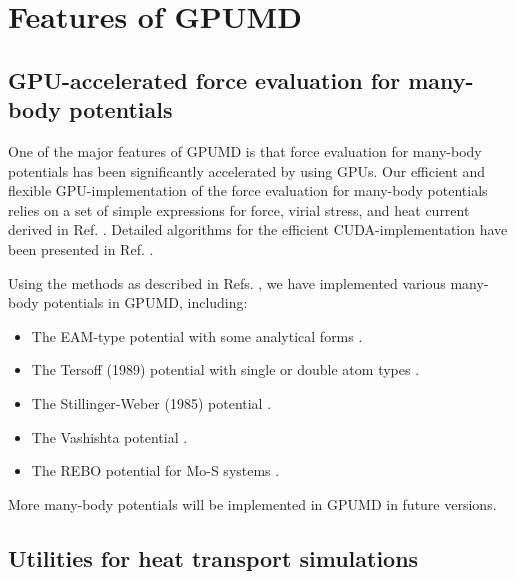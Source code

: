 \documentclass[12pt,a4paper]{report}
\begin{document}
\chapter{Features of GPUMD}


\section{GPU-accelerated force evaluation for many-body potentials}

One of the major features of GPUMD is that force evaluation for many-body potentials has been significantly accelerated by using GPUs. Our efficient and flexible GPU-implementation of the force evaluation for many-body potentials relies on a set of simple expressions for force, virial stress, and heat current derived in Ref. \cite{fan2015prb}. Detailed algorithms for the efficient CUDA-implementation have been presented in Ref. \cite{fan2017cpc}.

Using the methods as described in Refs. \cite{fan2015prb,fan2017cpc}, we have implemented various many-body potentials in GPUMD, including:
\begin{itemize}
\item The EAM-type potential with some analytical forms \cite{zhou2004prb,dai2006jpcm}.
\item The Tersoff (1989) potential with single or double atom types \cite{tersoff1989prb}.
\item The Stillinger-Weber (1985) potential \cite{stillinger1985prb}.
\item The Vashishta potential \cite{vashishta2007jap}.
\item The REBO potential for Mo-S systems \cite{liang2009prb}.
\end{itemize}
More many-body potentials will be implemented in GPUMD in future versions.

\section{Utilities for heat transport simulations}
\end{document}
